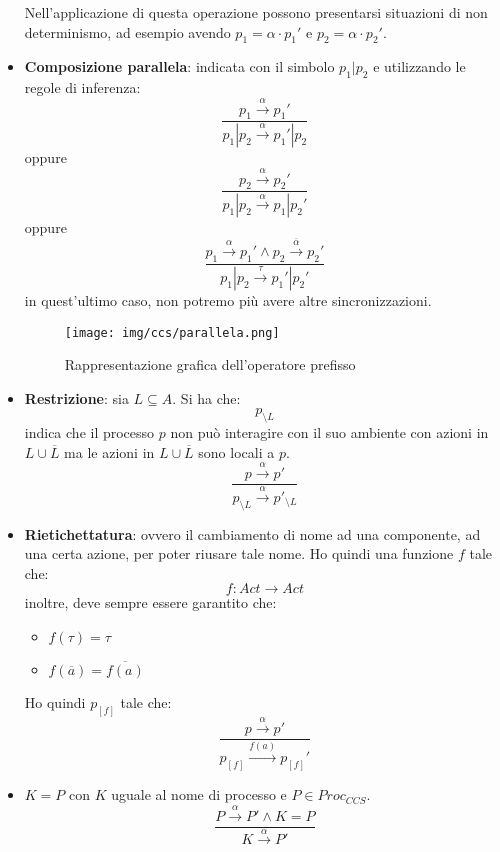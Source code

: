 \begin{itemize}
          Nell'applicazione di questa operazione possono presentarsi situazioni
          di non determinismo, ad esempio avendo $p_1 = \alpha \cdot p_1'$ e $p_2 = \alpha \cdot p_2'$.
    \item \textbf{Composizione parallela}: indicata con il simbolo $p_1 | p_2$ e
          utilizzando le regole di inferenza:
          $$\frac{p_1 \xrightarrow{\alpha} p_1'}{p_1 | p_2 \xrightarrow{\alpha} p_1' | p_2}$$
          oppure $$\frac{p_2 \xrightarrow{\alpha} p_2'}{p_1 | p_2 \xrightarrow{\alpha} p_1 | p_2'}$$
          oppure $$\frac{p_1 \xrightarrow{\alpha} p_1' \land p_2 \xrightarrow{\overline{\alpha}} p_2'}{p_1 | p_2 \xrightarrow{\tau} p_1' | p_2'}$$
          in quest'ultimo caso, non potremo più avere altre sincronizzazioni.
          \begin{figure}[!ht]
              \centering
              \texttt{[image: img/ccs/parallela.png]}
              \caption{Rappresentazione grafica dell'operatore prefisso}
          \end{figure}
    \item \textbf{Restrizione}: sia $L \subseteq A$. Si ha che: $$p_{\setminus L}$$
          indica che il processo $p$ non può interagire con il suo ambiente con azioni
          in $L \cup \overline{L}$ ma le azioni in $L \cup \overline{L}$ sono locali a
          $p$. $$\frac{p \xrightarrow{\alpha} p'}{ p_{\setminus L} \xrightarrow{\alpha} p'_{\setminus L}}$$
    \item \textbf{Rietichettatura}: ovvero il cambiamento di nome ad una
          componente, ad una certa azione, per poter riusare tale nome. Ho quindi una
          funzione $f$ tale che:
          \begin{equation}
              f: Act \to Act
          \end{equation}
          inoltre, deve sempre essere garantito che:
          \begin{itemize}
              \item $f(\tau) = \tau$
              \item $f(\overline{a}) = \overline{f(a)}$
          \end{itemize}

          Ho quindi $p_{[f]}$ tale che: $$\frac{p \xrightarrow{\alpha} p'}{p_{[f]} \xrightarrow{f(a)} p_{[f]}'}$$
    \item $K = P$ con $K$ uguale al nome di processo e $P \in Proc_{CCS}$.
          $$\frac{P \xrightarrow{\alpha} P' \land K = P}{K \xrightarrow{\alpha} P'}$$
\end{itemize}
